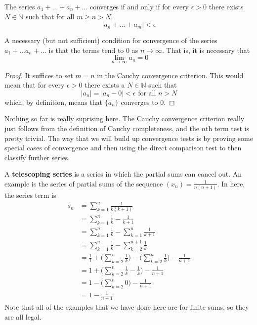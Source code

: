   \begin{theorem}
    The series $a_1 + \ldots + a_n + \ldots$ converges if and only if for every $\epsilon > 0$ there exists $N \in \mathbb{N}$ such that for all $m \geq n > N$, 
    \begin{equation}
      |a_n + \ldots + a_m| < \epsilon
    \end{equation}
  \end{theorem}

  \begin{corollary}
    A necessary (but not sufficient) condition for convergence of the series $a_1 + \ldots a_n + \ldots$ is that the terms tend to $0$ as $n \rightarrow \infty$. That is, it is necessary that
    \begin{equation}
      \lim_{n\rightarrow \infty} a_n = 0
    \end{equation}
  \end{corollary}
  \begin{proof}
    It suffices to set $m = n$ in the Cauchy convergence criterion. This would mean that for every $\epsilon > 0$ there exists a $N \in \mathbb{N}$ such that 
    \begin{equation}
      |a_n| = |a_n - 0| < \epsilon \text{ for all } n > N
    \end{equation}
    which, by definition, means that $\{a_n\}$ converges to $0$. 
  \end{proof} 

  Nothing so far is really suprising here. The Cauchy convergence criterion really just follows from the definition of Cauchy completeness, and the $n$th term test is pretty trivial. The way that we will build up convergence tests is by proving some special cases of convergence and then using the direct comparison test to then classify further series.     

  \begin{example}
    A \textbf{telescoping series} is a series in which the partial sums can cancel out. An example is the series of partial sums of the sequence $(x_n) = \frac{1}{n (n+1)}$. In here, the series term is
    \begin{align}
      s_n & = \sum_{k=1}^n \frac{1}{k(k+1)} \\ 
          & = \sum_{k=1}^n \frac{1}{k} - \frac{1}{k+1} \\
          & = \sum_{k=1}^n \frac{1}{k} - \sum_{k=1}^n \frac{1}{k+1} \\
          & = \sum_{k=1}^n \frac{1}{k} - \sum_{k=2}^{n+1} \frac{1}{k} \\
          & = \frac{1}{1} + \bigg( \sum_{k=2}^n \frac{1}{k} \bigg) - \bigg( \sum_{k=2}^n \frac{1}{k} \bigg) - \frac{1}{n+1} \\
          & = 1 + \bigg( \sum_{k=2}^n \frac{1}{k} - \frac{1}{k} \bigg) - \frac{1}{n+1} \\
          & = 1 - \bigg( \sum_{k=2}^n 0 \bigg) - \frac{1}{n+1} \\
          & = 1 - \frac{1}{n+1} 
    \end{align} 
    Note that all of the examples that we have done here are for finite sums, so they are all legal. 
  \end{example}

